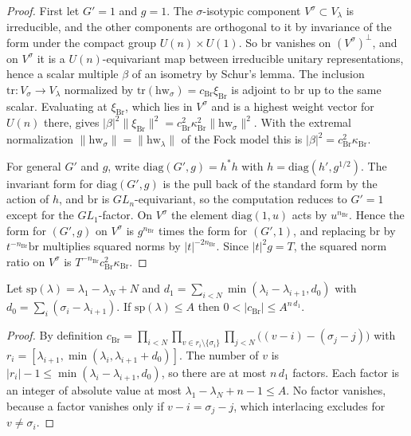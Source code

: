 \begin{proof}
First let $G'=1$ and $g=1$. The $\sigma$-isotypic component $V^\sigma\subset V_\lambda$ is irreducible, and the other components are orthogonal to it by invariance of the form under the compact group $U(n)\times U(1)$. So $\mathrm{br}$ vanishes on $(V^\sigma)^\perp$, and on $V^\sigma$ it is a $U(n)$-equivariant map between irreducible unitary representations, hence a scalar multiple $\beta$ of an isometry by Schur's lemma. The inclusion $\mathrm{tr}\colon V_\sigma\to V_\lambda$ normalized by $\mathrm{tr}(\mathrm{hw}_\sigma)=c_{\mathrm{Br}}\xi_{\mathrm{Br}}$ is adjoint to $\mathrm{br}$ up to the same scalar. Evaluating at $\xi_{\mathrm{Br}}$, which lies in $V^\sigma$ and is a highest weight vector for $U(n)$ there, gives $\lvert\beta\rvert^2\lVert\xi_{\mathrm{Br}}\rVert^2=c_{\mathrm{Br}}^2\kappa_{\mathrm{Br}}^2\lVert\mathrm{hw}_\sigma\rVert^2$. With the extremal normalization $\lVert\mathrm{hw}_\sigma\rVert=\lVert\mathrm{hw}_\lambda\rVert$ of the Fock model this is $\lvert\beta\rvert^2=c_{\mathrm{Br}}^2\kappa_{\mathrm{Br}}$.

For general $G'$ and $g$, write $\mathrm{diag}(G',g)=h^*h$ with $h=\mathrm{diag}(h',g^{1/2})$. The invariant form for $\mathrm{diag}(G',g)$ is the pull back of the standard form by the action of $h$, and $\mathrm{br}$ is $GL_n$-equivariant, so the computation reduces to $G'=1$ except for the $GL_1$-factor. On $V^\sigma$ the element $\mathrm{diag}(1,u)$ acts by $u^{n_{\mathrm{Br}}}$. Hence the form for $(G',g)$ on $V^\sigma$ is $g^{n_{\mathrm{Br}}}$ times the form for $(G',1)$, and replacing $\mathrm{br}$ by $t^{-n_{\mathrm{Br}}}\mathrm{br}$ multiplies squared norms by $\lvert t\rvert^{-2n_{\mathrm{Br}}}$. Since $\lvert t\rvert^2g=T$, the squared norm ratio on $V^\sigma$ is $T^{-n_{\mathrm{Br}}}c_{\mathrm{Br}}^2\kappa_{\mathrm{Br}}$.
\end{proof}

\begin{lemma}\label{w3:W3:cbr}
Let $\mathrm{sp}(\lambda)=\lambda_1-\lambda_N+N$ and $d_1=\sum_{i<N}\min(\lambda_i-\lambda_{i+1},d_0)$ with $d_0=\sum_i(\sigma_i-\lambda_{i+1})$. If $\mathrm{sp}(\lambda)\le A$ then $0<\lvert c_{\mathrm{Br}}\rvert\le A^{n\,d_1}$.
\end{lemma}

\begin{proof}
By definition $c_{\mathrm{Br}}=\prod_{i<N}\prod_{v\in r_i\setminus\{\sigma_i\}}\prod_{j<N}\big((v-i)-(\sigma_j-j)\big)$ with $r_i=[\lambda_{i+1},\min(\lambda_i,\lambda_{i+1}+d_0)]$. The number of $v$ is $\lvert r_i\rvert-1\le\min(\lambda_i-\lambda_{i+1},d_0)$, so there are at most $n\,d_1$ factors. Each factor is an integer of absolute value at most $\lambda_1-\lambda_N+n-1\le A$. No factor vanishes, because a factor vanishes only if $v-i=\sigma_j-j$, which interlacing excludes for $v\ne\sigma_i$.
\end{proof}

